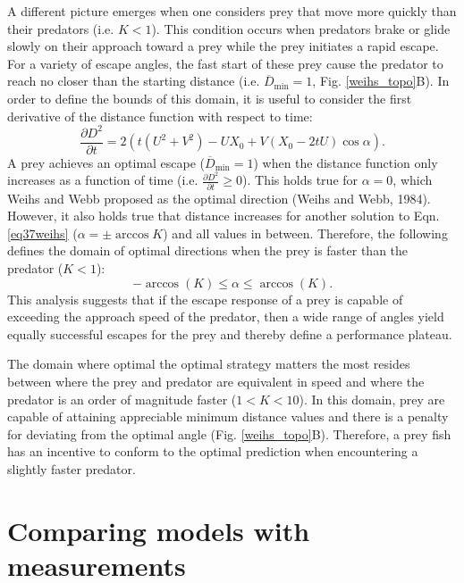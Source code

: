 \documentclass[12pt]{article}
\def\d{\partial}
\newcommand{\ol}{\overline}
\begin{document}
A different picture emerges when one considers prey that move more quickly than their predators (i.e. $K<1$). This condition occurs when predators brake or glide slowly on their approach toward a prey \citep{Higham:2007go, Higham:2005iu} while the prey initiates a rapid escape. For a variety of escape angles, the fast start of these prey cause the predator to reach no closer than the starting distance (i.e. $\ol D_{\text{min}}=1$, Fig. \ref{weihs_topo}B). In order to define the bounds of this domain, it is useful to consider the first derivative of the distance function with respect to time:
%
\begin{equation}
\frac{\d D^2}{\d t}= 2(t(U^2+V^2) - UX_0 + V(X_0-2tU)\cos\alpha).
\label{distderivative}
\end{equation}  
%
A prey achieves an optimal escape ($\ol D_{\text{min}}=1$) when the distance function only increases as a function of time (i.e. $\frac{\d D^2}{\d t}\geq0$). This holds true for $\alpha=0$, which Weihs and Webb proposed as the optimal direction (Weihs and Webb, 1984). However, it also holds true that distance increases for another solution to Eqn. \ref{eq37weihs} ($\alpha= \pm \arccos K$) and all values in between. Therefore, the following defines the domain of optimal directions when the prey is faster than the predator ($K<1$):
%
\begin{equation}
-\arccos(K) \leq \alpha \leq \arccos(K).
\label{anglerange}
\end{equation}
%
This analysis suggests that if the escape response of a prey is capable of exceeding the approach speed of the predator, then a wide range of angles yield equally successful escapes for the prey and thereby define a performance plateau. 

The domain where optimal the optimal strategy matters the most resides between where the prey and predator are equivalent in speed and where the predator is an order of magnitude faster ($1<K<10$). In this domain, prey are capable of attaining appreciable minimum distance values and there is a penalty for deviating from the optimal angle (Fig. \ref{weihs_topo}B). Therefore, a prey fish has an incentive to conform to the optimal prediction when encountering a slightly faster predator.

\section{Comparing models with measurements}
\end{document}

